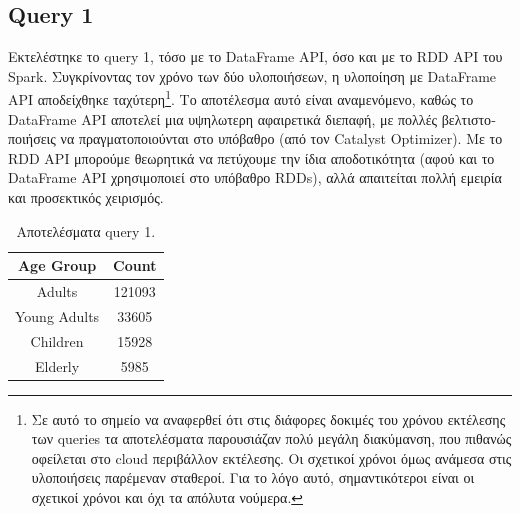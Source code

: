 \documentclass[a4paper,12pt]{article}
\begin{document}
\begin{otherlanguage}{greek}
\section*{Query 1}
	\FloatBarrier
	Εκτελέστηκε το query 1, τόσο με το DataFrame API, όσο και
	με το RDD API του Spark.
	Συγκρίνοντας τον χρόνο των δύο υλοποιήσεων, η υλοποίηση με DataFrame API
	αποδείχθηκε ταχύτερη\footnote{Σε αυτό το σημείο να αναφερθεί
	ότι στις διάφορες δοκιμές του χρόνου
	εκτέλεσης των queries τα αποτελέσματα παρουσιάζαν πολύ μεγάλη διακύμανση, που
	πιθανώς οφείλεται στο cloud περιβάλλον εκτέλεσης. Οι σχετικοί χρόνοι όμως
	ανάμεσα στις υλοποιήσεις παρέμεναν σταθεροί. Για το λόγο αυτό, 
	σημαντικότεροι είναι οι σχετικοί χρόνοι και όχι τα απόλυτα νούμερα.}.
	Το αποτέλεσμα αυτό είναι αναμενόμενο, καθώς το DataFrame API αποτελεί μια
	υψηλωτερη αφαιρετικά διεπαφή, με πολλές βελτιστοποιήσεις να πραγματοποιούνται
	στο υπόβαθρο (από τον Catalyst Optimizer). Με το RDD API μπορούμε
	θεωρητικά να πετύχουμε την ίδια αποδοτικότητα 
	(αφού και το DataFrame API χρησιμοποιεί στο υπόβαθρο RDDs), 
	αλλά απαιτείται πολλή εμειρία και προσεκτικός χειρισμός.
	\begin{table}[h]
		\centering
		\begin{tabular}{cc}
			Age Group & Count \\
			\hline
			Adults & 121093 \\
			Young Adults & 33605 \\
			Children & 15928 \\
			Elderly & 5985
		\end{tabular}
		\caption{Αποτελέσματα query 1.}
	\end{table}
	\FloatBarrier


\end{otherlanguage}
\end{document}
